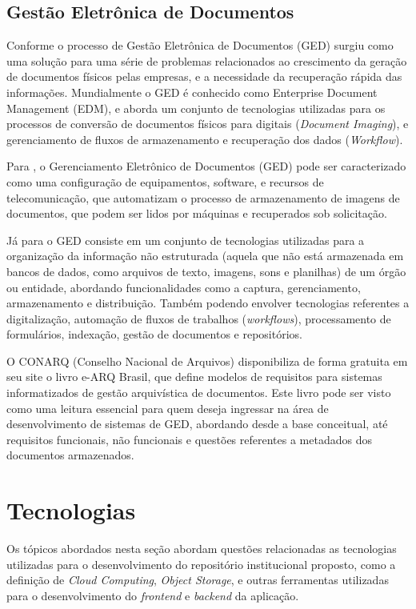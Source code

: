\subsection{Gestão Eletrônica de Documentos}

Conforme \cite{2020:Anjos} o processo de Gestão Eletrônica de Documentos (GED)
surgiu como uma solução para uma série de problemas relacionados ao crescimento
da geração de documentos físicos pelas empresas, e a necessidade da recuperação
rápida das informações. Mundialmente o GED é conhecido como Enterprise Document
Management (EDM), e aborda um conjunto de tecnologias utilizadas para os processos
de conversão de documentos físicos para digitais (\emph{Document Imaging}), e gerenciamento
de fluxos de armazenamento e recuperação dos dados (\emph{Workflow}).

Para \cite{2002:Avedon}, o Gerenciamento Eletrônico de Documentos (GED) pode ser
caracterizado como uma configuração de equipamentos, software, e recursos de
telecomunicação, que automatizam o processo de armazenamento de imagens de
documentos, que podem ser lidos por máquinas e recuperados sob solicitação.

Já para \cite{2022:Conarq} o GED consiste em um conjunto de tecnologias
utilizadas para a organização da informação não estruturada (aquela que não
está armazenada em bancos de dados, como arquivos de texto, imagens, sons e
planilhas) de um órgão ou entidade, abordando funcionalidades como a captura,
gerenciamento, armazenamento e distribuição. Também podendo envolver tecnologias
referentes a digitalização, automação de fluxos de trabalhos (\emph{workflows}),
processamento de formulários, indexação, gestão de documentos e repositórios.

O CONARQ (Conselho Nacional de Arquivos) disponibiliza de forma gratuita em
seu site o livro e-ARQ Brasil, que define modelos de requisitos para sistemas
informatizados de gestão arquivística de documentos. Este livro pode ser visto
como uma leitura essencial para quem deseja ingressar na área de desenvolvimento
de sistemas de GED, abordando desde a base conceitual, até requisitos funcionais,
não funcionais e questões referentes a metadados dos documentos armazenados.

\section{Tecnologias}\label{sec:technology}

Os tópicos abordados nesta seção abordam questões relacionadas
as tecnologias utilizadas para o desenvolvimento do repositório institucional
proposto, como a definição de \emph{Cloud Computing}, \emph{Object Storage},
e outras ferramentas utilizadas para o desenvolvimento do \emph{frontend} e
\emph{backend} da aplicação.

